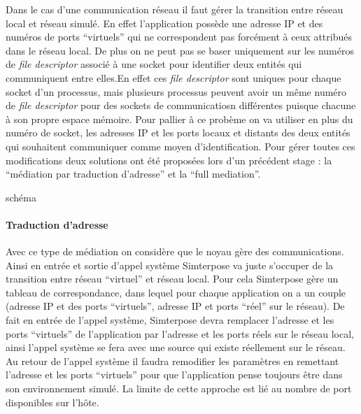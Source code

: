 Dans le cas d'une communication réseau il faut gérer la transition
entre réseau local et réseau simulé. En effet l'application possède
une adresse IP et des numéros de ports ``virtuels'' qui ne
correspondent pas forcément à ceux attribués dans le réseau local. De
plus on ne peut pas se baser uniquement sur les numéros de
\textit{file descriptor} associé à une socket pour identifier deux
entités qui communiquent entre elles.En effet ces \textit{file
  descriptor} sont uniques pour chaque socket d'un processus, mais
plusieurs processus peuvent avoir un même numéro de \textit{file
  descriptor} pour des sockets de communicatiosn différentes puisque
chacune à son propre espace mémoire. Pour pallier à ce probème on va
utiliser en plus du numéro de socket, les adresses IP et les ports
locaux et distants des deux entités qui souhaitent communiquer comme
moyen d'identification. Pour gérer toutes ces modifications deux
solutions ont été proposées lors d'un précédent stage
\cite{interception:GUILLAUME:interception_syscall}: la ``médiation par
traduction d'adresse'' et la ``full mediation''.

{\color{red}schéma}
\paragraph{Traduction d'adresse}
 Avec ce type de médiation on considère que le noyau gère des
 communications. Ainsi en entrée et sortie d'appel système Simterpose va juste
 s'occuper de la transition entre réseau ``virtuel'' et réseau local. Pour cela
 Simterpose gère un tableau de correspondance, dans lequel pour chaque
 application on a un couple (adresse IP et des ports ``virtuels'', adresse IP et
 ports ``réel'' sur le réseau).  De fait en entrée de l'appel système,
 Simterpose devra remplacer l'adresse et les ports ``virtuels'' de l'application
 par l'adresse et les ports réels sur le réseau local, ainsi l'appel système se
 fera avec une source qui existe réellement sur le réseau. Au retour de l'appel
 système il faudra remodifier les paramètres en remettant l'adresse et les ports
 ``virtuels'' pour que l'application pense toujours être dans son environnement
 simulé.  La limite de cette approche est lié au nombre de port disponibles sur
 l'hôte. 

